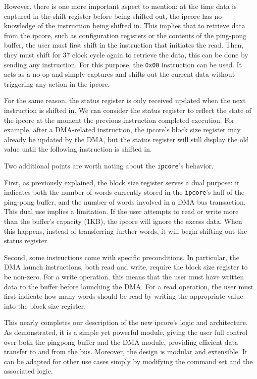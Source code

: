 \documentclass[a4paper,11pt,oneside]{report}
\begin{document}
However, there is one more important aspect to mention: at the time data is captured in the shift register before being shifted out, 
the ipcore has no knowledge of the instruction being shifted in. 
This implies that to retrieve data from the ipcore, such as configuration registers 
or the contents of the ping-pong buffer, the user must first shift in the instruction that initiates the read. 
Then, they must shift for 37 clock cycle again to retrieve the data, this can be done by sending any instruction.
For this purpose, the \texttt{0x00} instruction can be used. 
It acts as a no-op and simply captures and shifts out the current data without triggering any action in the ipcore.

For the same reason, the status register is only received updated when the next instruction is shifted in. 
We can consider the status register to reflect the state of the ipcore 
at the moment the previous instruction completed execution. 
For example, after a DMA-related instruction, 
the ipcore's block size register may already be updated by the DMA, 
but the status register will still display the old value until the following instruction is shifted in.

Two additional points are worth noting about the \texttt{ipcore}'s behavior.

First, as previously explained, the block size register serves a dual purpose:
it indicates both the number of words currently stored in the \texttt{ipcore}'s half of the ping-pong buffer,
and the number of words involved in a DMA bus transaction.
This dual use implies a limitation. If the user attempts to read or write more than the buffer's capacity (1KB), 
the ipcore will ignore the excess data. When this happens, instead of transferring further words,
it will begin shifting out the status register.

Second, some instructions come with specific preconditions. 
In particular, the DMA launch instructions, both read and write, require the block size register to be non-zero.
For a write operation, this means that the user must have written data to the buffer before launching the DMA.
For a read operation, the user must first indicate how many words should be read by writing the appropriate value into the block size register.

This nearly completes our description of the new ipcore's logic and architecture. 
As demonstrated, it is a simple yet powerful module, giving the user full control over both the pingpong buffer and the DMA module, providing efficient data transfer to and from the bus.
Moreover, the design is modular and extensible. 
It can be adapted for other use cases simply by modifying the command set and the associated logic.
\end{document}
